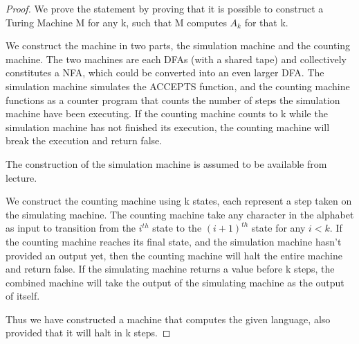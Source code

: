 \documentclass[11pt]{article}
\begin{document}
\begin{proof}

We prove the statement by proving that it is possible to construct a Turing Machine M for any k, such that M computes $A_{k}$ for that k.

We construct the machine in two parts, the simulation machine and the counting machine. The two machines are each DFAs (with a shared tape) and collectively constitutes a NFA, which could be converted into an even larger DFA. The simulation machine simulates the ACCEPTS function, and the counting machine functions as a counter program that counts the number of steps the simulation machine have been executing. If the counting machine counts to k while the simulation machine has not finished its execution, the counting machine will break the execution and return false.

The construction of the simulation machine is assumed to be available from lecture.

We construct the counting machine using k states, each represent a step taken on the simulating machine. The counting machine take any character in the alphabet as input to transition from the $i^{th}$ state to the $(i+1)^{th}$ state for any $i < k$. If the counting machine reaches its final state, and the simulation machine hasn't provided an output yet, then the counting machine will halt the entire machine and return false. If the simulating machine returns a value before k steps, the combined machine will take the output of the simulating machine as the output of itself.

Thus we have constructed a machine that computes the given language, also provided that it will halt in k steps.

\end{proof}
\end{document}
